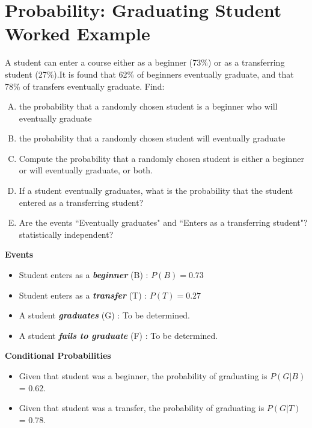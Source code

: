 \documentclass[a4paper,12pt]{article}
\begin{document}
\section*{Probability: Graduating Student Worked Example }
A student can enter a course either as a beginner (73\%) or as a transferring student (27\%).It is found that 62\% of beginners eventually graduate, and that 78\% of transfers eventually graduate. Find: 
\begin{enumerate}[(A)]
	\item the probability that a randomly chosen student is a beginner who will
	eventually graduate
	\item the probability that a randomly chosen student will eventually graduate
\item Compute the probability that a randomly chosen student is either a beginner or will
eventually graduate, or both.
\item If a student eventually graduates, what is the probability that the student entered
as a transferring student?
\item Are the events ``Eventually graduates" and ``Enters as a transferring student"?
statistically independent?
\end{enumerate}
\begin{framed}	
\noindent \textbf{Events}
	
	\begin{itemize}
		\item Student enters as a \textbf{\emph{beginner}} (B) : $P(B)=0.73$
		\item Student enters as a \textbf{\emph{transfer}} (T) : $P(T)=0.27$
		\item A student \textbf{\emph{graduates}} (G) : To be determined.
				\item A student \textbf{\emph{fails to graduate}} (F) : To be determined.
	\end{itemize}
\end{framed}
\textbf{Conditional Probabilities}
\begin{itemize}
	\item Given that student was a beginner, the probability of graduating is $P(G|B)$ = 0.62.
	\item Given that student was a transfer, the probability of graduating is $P(G|T)$ = 0.78.
\end{itemize}

\end{document}
